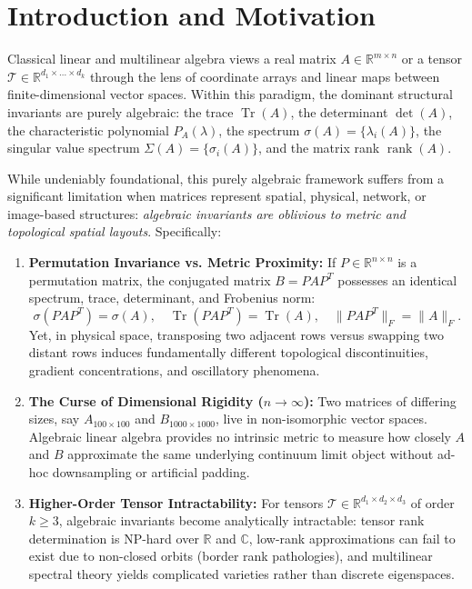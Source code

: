 \documentclass[11pt,a4paper,reqno]{amsart}
\theoremstyle{definition}
\numberwithin{equation}{section}
\providecommand{\R}{\mathbb{R}}
\newcommand{\C}{\mathbb{C}}
\newcommand{\Tr}{\operatorname{Tr}}
\newcommand{\rank}{\operatorname{rank}}
\begin{document}
\maketitle

\tableofcontents

\newpage

\section{Introduction and Motivation}
\label{sec:intro}

Classical linear and multilinear algebra views a real matrix $A \in \R^{m \times n}$ or a tensor $\mathcal{T} \in \R^{d_1 \times \dots \times d_k}$ through the lens of coordinate arrays and linear maps between finite-dimensional vector spaces. Within this paradigm, the dominant structural invariants are purely algebraic: the trace $\Tr(A)$, the determinant $\det(A)$, the characteristic polynomial $P_A(\lambda)$, the spectrum $\sigma(A) = \{\lambda_i(A)\}$, the singular value spectrum $\Sigma(A) = \{\sigma_i(A)\}$, and the matrix rank $\rank(A)$.

While undeniably foundational, this purely algebraic framework suffers from a significant limitation when matrices represent spatial, physical, network, or image-based structures: \emph{algebraic invariants are oblivious to metric and topological spatial layouts}. Specifically:
\begin{enumerate}[label=(\alph*)]
    \item \textbf{Permutation Invariance vs. Metric Proximity:} If $P \in \R^{n \times n}$ is a permutation matrix, the conjugated matrix $B = P A P^T$ possesses an identical spectrum, trace, determinant, and Frobenius norm:
    \begin{equation}
        \sigma(P A P^T) = \sigma(A), \quad \Tr(P A P^T) = \Tr(A), \quad \|P A P^T\|_F = \|A\|_F.
    \end{equation}
    Yet, in physical space, transposing two adjacent rows versus swapping two distant rows induces fundamentally different topological discontinuities, gradient concentrations, and oscillatory phenomena.
    \item \textbf{The Curse of Dimensional Rigidity ($n \to \infty$):} Two matrices of differing sizes, say $A_{100 \times 100}$ and $B_{1000 \times 1000}$, live in non-isomorphic vector spaces. Algebraic linear algebra provides no intrinsic metric to measure how closely $A$ and $B$ approximate the same underlying continuum limit object without ad-hoc downsampling or artificial padding.
    \item \textbf{Higher-Order Tensor Intractability:} For tensors $\mathcal{T} \in \R^{d_1 \times d_2 \times d_3}$ of order $k \ge 3$, algebraic invariants become analytically intractable: tensor rank determination is NP-hard over $\R$ and $\C$, low-rank approximations can fail to exist due to non-closed orbits (border rank pathologies), and multilinear spectral theory yields complicated varieties rather than discrete eigenspaces.
\end{enumerate}
\end{document}
